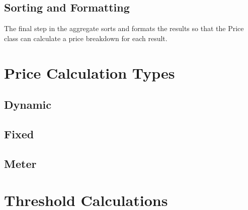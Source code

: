 \subsection{Sorting and Formatting}
The final step in the aggregate sorts and formats the results so that the Price class can calculate a price breakdown for each result.

%
\section{Price Calculation Types}
\subsection{Dynamic}
\subsection{Fixed}
\subsection{Meter}

%
\section{Threshold Calculations}

%


